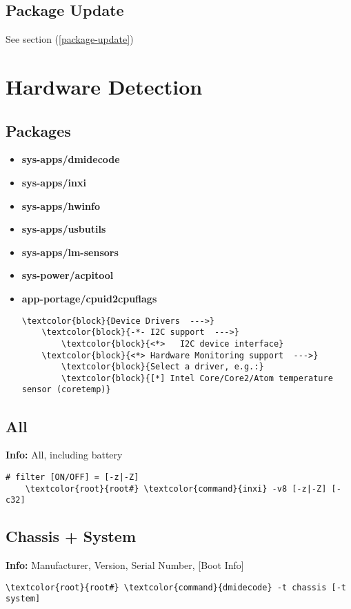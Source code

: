 \documentclass[10pt, a4paper, onecolumn, openany]{book}         %
\begin{document}
\section{Package Update}
See section (\underline{\ref{package-update}})





\chapter{Hardware Detection}%
\label{hw-detection}
\section{Packages}
\begin{itemize}
    \item \textbf{sys-apps/dmidecode}
    \item \textbf{sys-apps/inxi}
    \item \textbf{sys-apps/hwinfo}
    \item \textbf{sys-apps/usbutils}
    \item \textbf{sys-apps/lm-sensors}
    \item \textbf{sys-power/acpitool}
    \item \textbf{app-portage/cpuid2cpuflags}
\begin{Verbatim}[commandchars=\\\{\}]
\textcolor{block}{Device Drivers  --->}
    \textcolor{block}{-*- I2C support  --->}
        \textcolor{block}{<*>   I2C device interface}
    \textcolor{block}{<*> Hardware Monitoring support  --->}
        \textcolor{block}{Select a driver, e.g.:}
        \textcolor{block}{[*] Intel Core/Core2/Atom temperature sensor (coretemp)}
\end{Verbatim}
\end{itemize}
\section{All}
\textbf{Info:} All, including battery
\begin{Verbatim}[commandchars=\\\{\}]
# filter [ON/OFF] = [-z|-Z]
    \textcolor{root}{root#} \textcolor{command}{inxi} -v8 [-z|-Z] [-c32]
\end{Verbatim}

\section{Chassis + System}
\textbf{Info:} Manufacturer, Version, Serial Number, [Boot Info]
\begin{Verbatim}[commandchars=\\\{\}]
    \textcolor{root}{root#} \textcolor{command}{dmidecode} -t chassis [-t system]
\end{Verbatim}
\end{document}

